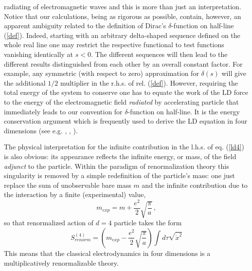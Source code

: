 \documentclass[a4paper,12pt]{article}
\begin{document}
radiating of electromagnetic waves and this is more than just an
interpretation. Notice that our calculations, being as rigorous as possible,
contain, however, an apparent ambiguity related to the definition of Dirac's
$\delta $-function on half-line (\ref{def}). Indeed, starting with an
arbitrary delta-shaped sequence defined on the whole real line one may
restrict the respective functional to test functions vanishing identically
at $s<0$. The different sequences will then lead to the different results
distinguished from each other by an overall constant factor. For example,
any symmetric (with respect to zero) approximation for $\delta (s)$ will
give the additional $1/2$ multiplier in the r.h.s. of rel. (\ref{def}).
However, requiring the total energy of the system to conserve one has to
equate the work of the LD force to the energy of the electromagnetic field
{\it radiated} by accelerating particle that immediately leads to our
convention for $\delta $-function on half-line. It is the energy
conservation argument which is frequently used to derive the LD equation in
four dimensions (see e.g. \cite{Dirac}, \cite{Jackson}, \cite{Poisson}).

The physical interpretation for the infinite contribution in the l.h.s. of
eq. (\ref{ld4}) is also obvious: its appearance reflects the infinite
energy, or mass, of the field {\it adjunct} to the particle. Within the
paradigm of renormalization theory this singularity is removed by a simple
redefinition of the particle's mass: one just replace the sum of
unobservable bare mass $m$ and the infinite contribution due to the
interaction by a finite (experimental) value,
\begin{equation}
m_{exp}=m+\frac{e^2}{2}\sqrt{\frac{\pi}{a}}\,,
\end{equation}
so that renormalized action of $d=4$ particle takes the form
\begin{equation}  \label{d4}
S^{(4)}_{renorm}=\left( m_{exp}-\frac{e^2}{2}\sqrt{\frac{\pi}{a}}\right)\int
d\tau\sqrt{\dot{x}^2}
\end{equation}
This means that the classical electrodynamics in four dimensions is a
multiplicatively renormalizable theory.
\end{document}
